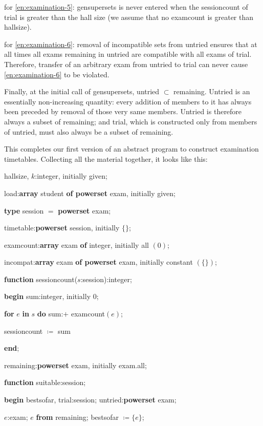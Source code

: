 for \ref{en:examination-5}: gensupersets is never entered when the sessioncount of trial is greater than the hall size (we assume that no examcount is greater than hallsize).

for \ref{en:examination-6}: removal of incompatible sets from untried ensures that at all times all exams remaining in untried are compatible with all exams of trial. Therefore, transfer of an arbitrary exam from untried to trial can never cause \ref{en:examination-6} to be violated.

Finally, at the initial call of gensupersets, untried $\subset$ remaining. Untried is an essentially non-increasing quantity: every addition of members to it has always been preceded by removal of those very same members. Untried is therefore always a subset of remaining; and trial, which is constructed only from members of untried, must also always be a subset of remaining.

This completes our first version of an abstract program to construct examination timetables. Collecting all the material together, it looks like this:

hallsize, $k$:integer, initially given;

load:\textbf{array} student \textbf{of powerset} exam, initially given;

\textbf{type} session $=$ \textbf{powerset} exam;

timetable:\textbf{powerset} session, initially $\{\}$;

examcount:\textbf{array} exam \textbf{of} integer, initially all $(0)$;

incompat:\textbf{array} exam \textbf{of powerset} exam, initially constant $(\{\})$;

\textbf{function} sessioncount($s$:session):integer;

\quad \textbf{begin} sum:integer, initially 0;

\quad \quad \textbf{for} $e$ \textbf{in} $s$ \textbf{do} sum:$+$ examcount$(e)$;

\quad \quad sessioncount $\coloneq$ sum

\quad \textbf{end};

\quad remaining:\textbf{powerset} exam, initially exam.all;

\textbf{function} suitable:session;

\quad \textbf{begin} bestsofar, trial:session; untried:\textbf{powerset} exam;

\quad \quad $e$:exam; $e$ \textbf{from} remaining; bestsofar $\coloneq \{e\}$;

